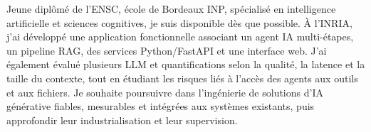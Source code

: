 
\begin{cvparagraph}
Jeune diplômé de l’ENSC, école de Bordeaux INP, spécialisé en intelligence artificielle et sciences cognitives, je suis disponible dès que possible. À l’INRIA, j’ai développé une application fonctionnelle associant un agent IA multi-étapes, un pipeline RAG, des services Python/FastAPI et une interface web. J’ai également évalué plusieurs LLM et quantifications selon la qualité, la latence et la taille du contexte, tout en étudiant les risques liés à l’accès des agents aux outils et aux fichiers. Je souhaite poursuivre dans l’ingénierie de solutions d’IA générative fiables, mesurables et intégrées aux systèmes existants, puis approfondir leur industrialisation et leur supervision.
\end{cvparagraph}
